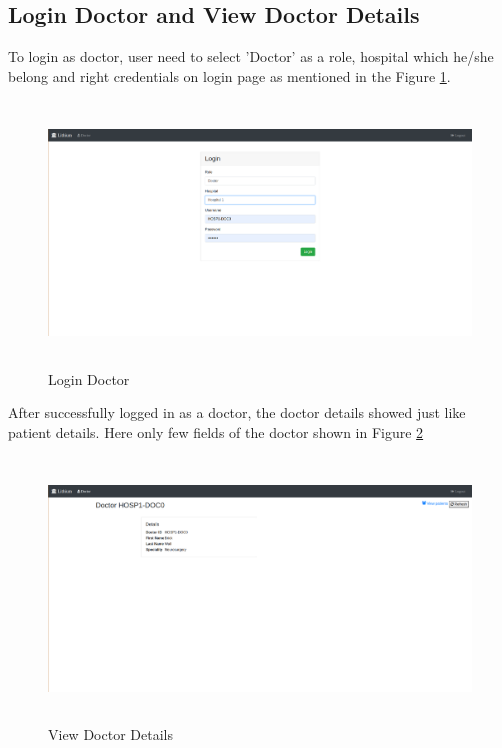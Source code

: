 \subsection{Login Doctor and View Doctor Details}
To login as doctor, user need to select 'Doctor' as a role, hospital which he/she belong and right credentials on login page as mentioned in the Figure \ref{fig:chapter04:doctor1}.

\begin{figure}[htbp]
 \centering
 \includegraphics[width=1.1\textwidth, height=7cm]{gfx/figures/doctor1.png}
 \caption{Login Doctor}
 \label{fig:chapter04:doctor1}
\end{figure}

After successfully logged in as a doctor, the doctor details showed just like patient details. Here only few fields of the doctor shown in Figure \ref{fig:chapter04:doctor2}

\begin{figure}[htbp]
 \centering
 \includegraphics[width=1.1\textwidth, height=7cm]{gfx/figures/doctor2.png}
 \caption{View Doctor Details}
 \label{fig:chapter04:doctor2}
\end{figure}

